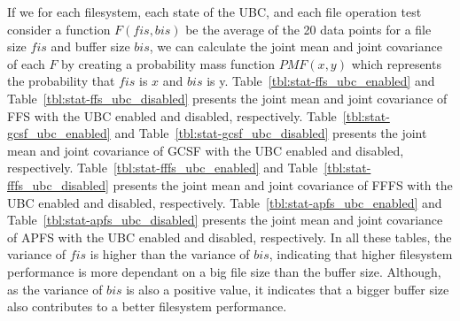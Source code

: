 If we for each filesystem, each state of the \gls{UBC}, and each file operation test consider a function $F(fis, bis)$ be the average of the 20 data points for a file size $fis$ and buffer size $bis$, we can calculate the joint mean and joint covariance of each $F$ by creating a probability mass function $PMF(x, y)$ which represents the probability that $fis$ is $x$ and $bis$ is y. Table~\ref{tbl:stat-ffs_ubc_enabled} and Table~\ref{tbl:stat-ffs_ubc_disabled} presents the joint mean and joint covariance of \gls{FFS} with the \gls{UBC} enabled and disabled, respectively. Table~\ref{tbl:stat-gcsf_ubc_enabled} and Table~\ref{tbl:stat-gcsf_ubc_disabled} presents the joint mean and joint covariance of \gls{GCSF} with the \gls{UBC} enabled and disabled, respectively. Table~\ref{tbl:stat-fffs_ubc_enabled} and Table~\ref{tbl:stat-fffs_ubc_disabled} presents the joint mean and joint covariance of \gls{FFFS} with the \gls{UBC} enabled and disabled, respectively. Table~\ref{tbl:stat-apfs_ubc_enabled} and Table~\ref{tbl:stat-apfs_ubc_disabled} presents the joint mean and joint covariance of \gls{APFS} with the \gls{UBC} enabled and disabled, respectively. In all these tables, the variance of $fis$ is higher than the variance of $bis$, indicating that higher filesystem performance is more dependant on a big file size than the buffer size. Although, as the variance of $bis$ is also a positive value, it indicates that a bigger buffer size also contributes to a better filesystem performance.


\FloatBarrier

\FloatBarrier



\FloatBarrier

\FloatBarrier



\FloatBarrier

\FloatBarrier



\FloatBarrier

\FloatBarrier


